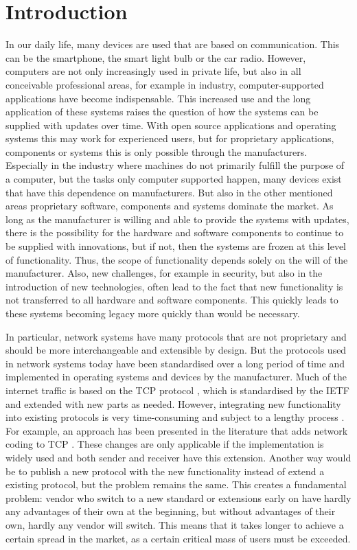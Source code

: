 \section{Introduction}
\label{sec:intro}

In our daily life, many devices are used that are based on communication. 
This can be the smartphone, the smart light bulb or the car radio. 
However, computers are not only increasingly used in private life, but also in all conceivable professional areas, for example in industry, computer-supported applications have become indispensable.  
This increased use and the long application of these systems raises the question of how the systems can be supplied with updates over time. 
With open source applications and operating systems this may work for experienced users, but for proprietary applications, components or systems this is only possible through the manufacturers.
Especially in the industry where machines do not primarily fulfill the purpose of a computer, but the tasks only computer supported happen, many devices exist that have this dependence on manufacturers. 
But also in the other mentioned areas proprietary software, components and systems dominate the market.
As long as the manufacturer is willing and able to provide the systems with updates, there is the possibility for the hardware and software components to continue to be supplied with innovations, but if not, then the systems are frozen at this level of functionality. 
Thus, the scope of functionality depends solely on the will of the manufacturer.
Also, new challenges, for example in security, but also in the introduction of new technologies, often lead to the fact that new functionality is not transferred to all hardware and software components. 
This quickly leads to these systems becoming legacy more quickly than would be necessary. 

In particular, network systems have many protocols that are not proprietary and should be more interchangeable and extensible by design. 
But the protocols used in network systems today have been standardised over a long period of time and implemented in operating systems and devices by the manufacturer.
Much of the internet traffic is based on the TCP protocol \cite{A3:john2007analysis}, which is standardised by the IETF and extended with new parts as needed. 
However, integrating new functionality into existing protocols is very time-consuming and subject to a lengthy process \cite{A3:de2019pluginizing}. 
For example, an approach has been presented in the literature that adds network coding to TCP \cite{A3:sundararajan2011network}. 
These changes are only applicable if the implementation is widely used and both sender and receiver have this extension. 
Another way would be to publish a new protocol with the new functionality instead of extend a existing protocol, but the problem remains the same. 
This creates a fundamental problem: vendor who switch to a new standard or extensions early on have hardly any advantages of their own at the beginning, but without advantages of their own, hardly any vendor will switch.
This means that it takes longer to achieve a certain spread in the market, as a certain critical mass of users must be exceeded. 

